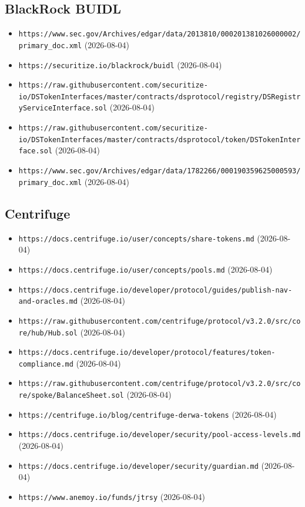 \subsection*{BlackRock BUIDL}
\begin{itemize}\setlength{\itemsep}{0pt}\small
\item \texttt{https://www.sec.gov/Archives/edgar/data/2013810/000201381026000002/primary\_doc.xml} (2026-08-04)
\item \texttt{https://securitize.io/blackrock/buidl} (2026-08-04)
\item \texttt{https://raw.githubusercontent.com/securitize-io/DSTokenInterfaces/master/contracts/dsprotocol/registry/DSRegistryServiceInterface.sol} (2026-08-04)
\item \texttt{https://raw.githubusercontent.com/securitize-io/DSTokenInterfaces/master/contracts/dsprotocol/token/DSTokenInterface.sol} (2026-08-04)
\item \texttt{https://www.sec.gov/Archives/edgar/data/1782266/000190359625000593/primary\_doc.xml} (2026-08-04)
\end{itemize}

\subsection*{Centrifuge}
\begin{itemize}\setlength{\itemsep}{0pt}\small
\item \texttt{https://docs.centrifuge.io/user/concepts/share-tokens.md} (2026-08-04)
\item \texttt{https://docs.centrifuge.io/user/concepts/pools.md} (2026-08-04)
\item \texttt{https://docs.centrifuge.io/developer/protocol/guides/publish-nav-and-oracles.md} (2026-08-04)
\item \texttt{https://raw.githubusercontent.com/centrifuge/protocol/v3.2.0/src/core/hub/Hub.sol} (2026-08-04)
\item \texttt{https://docs.centrifuge.io/developer/protocol/features/token-compliance.md} (2026-08-04)
\item \texttt{https://raw.githubusercontent.com/centrifuge/protocol/v3.2.0/src/core/spoke/BalanceSheet.sol} (2026-08-04)
\item \texttt{https://centrifuge.io/blog/centrifuge-derwa-tokens} (2026-08-04)
\item \texttt{https://docs.centrifuge.io/developer/security/pool-access-levels.md} (2026-08-04)
\item \texttt{https://docs.centrifuge.io/developer/security/guardian.md} (2026-08-04)
\item \texttt{https://www.anemoy.io/funds/jtrsy} (2026-08-04)
\end{itemize}

